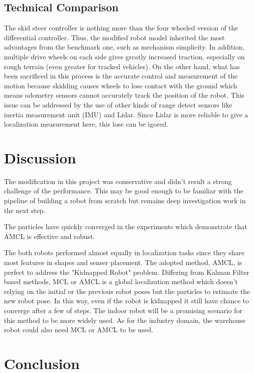 \documentclass[10pt,journal,compsoc]{IEEEtran}
\begin{document}
\subsection{Technical Comparison} %

The skid steer controller is nothing more than the four wheeled version of the differential controller. Thus, the modified robot model inherited the most advantages from the benchmark one, such as mechanism simplicity. In addition, multiple drive wheels on each side gives greatly increased traction, especially on rough terrain (even greater for tracked vehicles). On the other hand, what has been sacrificed in this process is the accurate control and measurement of the motion because skidding causes wheels to lose contact with the ground which means odometry sensors cannot accurately track the position of the robot. This issue can be addressed by the use of other kinds of range detect sensors like inertia measurement unit (IMU) and Lidar. Since Lidar is more reliable to give a localization measurement here, this lose can be igored.

\section{Discussion}

The modification in this project was conservative and didn't result a strong challenge of the performance. This may be good enough to be familiar with the pipeline of building a robot from scratch but remains deep investigation work in the next step.

The particles have quickly converged in the experiments which demonstrate that AMCL is effective and robust.

The both robots performed almost equally in localization tasks since they share most features in shapes and senser placement. The adopted method, AMCL, is perfect to address the "Kidnapped Robot" problem. Differing from Kalman Filter based methods, MCL or AMCL is a global localization method which doesn't relying on the initial or the previous robot poses but the particles to estimate the new robot pose. In this way, even if the robot is kidnapped it still have chance to converge after a few of steps. The indoor robot will be a promising scenario for this method to be more widely used. As for the industry domain, the warehouse robot could also need MCL or AMCL to be used.

\section{Conclusion}
\end{document}
